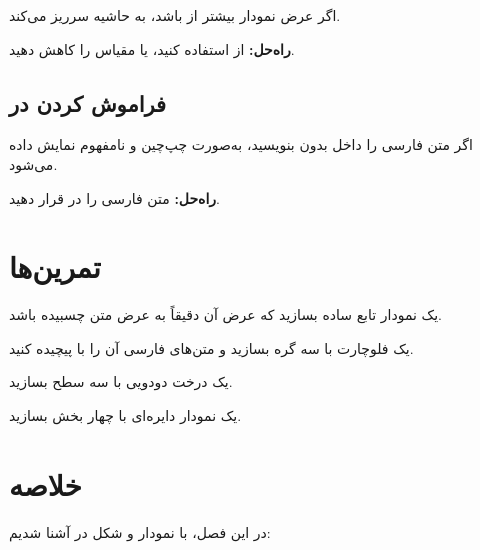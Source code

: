 اگر عرض نمودار بیشتر از  باشد،
به حاشیه سرریز می‌کند.

\textbf{راه‌حل:} از 
استفاده کنید، یا مقیاس را کاهش دهید.

\subsection{فراموش کردن  در }
\label{sec:graphics-mistake-rl}

اگر متن فارسی را داخل  بدون
 بنویسید، به‌صورت چپ‌چین و نامفهوم
نمایش داده می‌شود.

\textbf{راه‌حل:} متن فارسی را در 
قرار دهید.

\section{تمرین‌ها}
\label{sec:graphics-exercises}

\begin{exercise}
    یک نمودار تابع ساده بسازید که عرض آن
    دقیقاً به عرض متن چسبیده باشد.
    \label{exc:graphics-simple}
\end{exercise}

\begin{exercise}
    یک فلوچارت با سه گره بسازید و متن‌های
    فارسی آن را با  پیچیده کنید.
    \label{exc:graphics-flowchart}
\end{exercise}

\begin{exercise}
    یک درخت دودویی با سه سطح بسازید.
    \label{exc:graphics-tree}
\end{exercise}

\begin{exercise}
    یک نمودار دایره‌ای با چهار بخش بسازید.
    \label{exc:graphics-pie}
\end{exercise}

\section{خلاصه}
\label{sec:graphics-summary}

در این فصل، با نمودار و شکل در 
آشنا شدیم:

